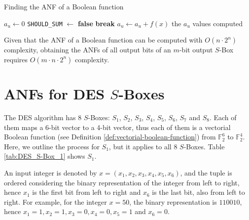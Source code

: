 \documentclass{report}
\begin{document}
\begin{algorithm}[h!]
\caption{Finding the ANF of a Boolean function}
\label{alg:anf-naive}
\begin{algorithmic}
 
    \State $a_u \leftarrow 0$
     
         
                \State \texttt{SHOULD_SUM} $\leftarrow$ \textbf{false}
                \State \textbf{break}
            \EndIf
        \EndFor
            \State $a_u \leftarrow a_u + f(x)$
        \EndIf
    \EndFor
\EndFor
\State \Return the $a_u$ values computed

\end{algorithmic}
\end{algorithm}

Given that the ANF of a Boolean function can be computed with $O(n \cdot 2^{n})$ complexity, obtaining the ANFs of all output bits of an $m$-bit output $S$-Box requires $O(m \cdot n \cdot 2^{n})$ complexity.

\section{ANFs for DES $S$-Boxes}
The DES algorithm \cite{DES-FIPS} has 8 $S$-Boxes: $S_1$, $S_2$, $S_3$, $S_4$, $S_5$, $S_6$, $S_7$ and $S_8$. Each of them maps a 6-bit vector to a 4-bit vector, thus each of them is a vectorial Boolean function (see Definition \ref{def:vectorial-boolean-function}) from $\mathbb{F}^6_2$ to $\mathbb{F}^4_2$. Here, we outline the process for $S_1$, but it applies to all 8 $S$-Boxes. Table \ref{tab:DES_S-Box_1} shows $S_1$.

An input integer is denoted by $x = (x_1, x_2, x_3, x_4, x_5, x_6)$, and the tuple is ordered considering the binary representation of the integer from left to right, hence $x_1$ is the first bit from left to right and $x_6$ is the last bit, also from left to right. For example, for the integer $x = 50$, the binary representation is $110010$, hence $x_1 = 1, x_2 = 1, x_3 = 0, x_4 = 0, x_5 = 1$ and $x_6 = 0$.
\end{document}
